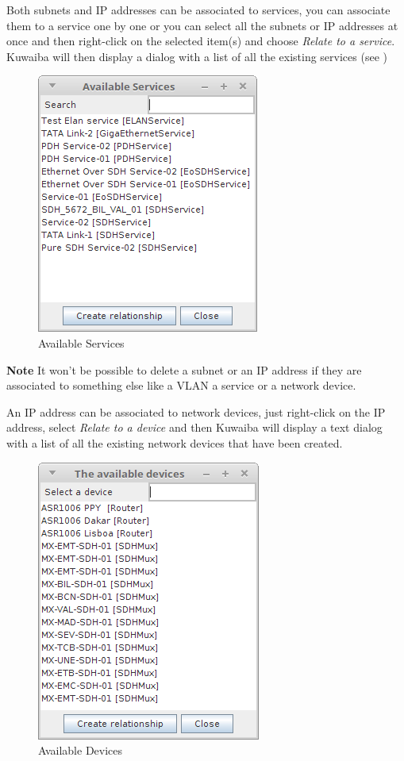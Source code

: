 \documentclass[a4paper]{article}
\begin{document}
		Both subnets and IP addresses can be associated to services, you can associate them to a service one by one or you can select all the subnets or IP addresses at once and then right-click on the selected item(s) and choose \textit{Relate to a service}. Kuwaiba will then display a dialog with a list of all the existing services  (see \textbf{})
		\begin{figure}[h!]
			\centering
			\includegraphics[width=0.4\linewidth]{img/ipam_available_services.png}
			\caption{Available Services}
			\label{fig:ipam_available_services}
		\end{figure}
		\begin{framed} {\large \textbf{Note}}
			It won't be possible to delete a subnet or an IP address if they are associated to something else like a VLAN a service or a network device.
		\end{framed}		 		 
		

		\newpage
		An IP address can be associated to network devices, just right-click on the IP address, select \textit{Relate to a device} and then Kuwaiba will display a text dialog with a list of all the existing network devices that have been created.
		\begin{figure}[h!]
			\centering
			\includegraphics[width=0.4\linewidth]{img/ipam_available_devices.png}
			\caption{Available Devices}
			\label{fig:ipam_available_devices}
		\end{figure}
		
\end{document}
